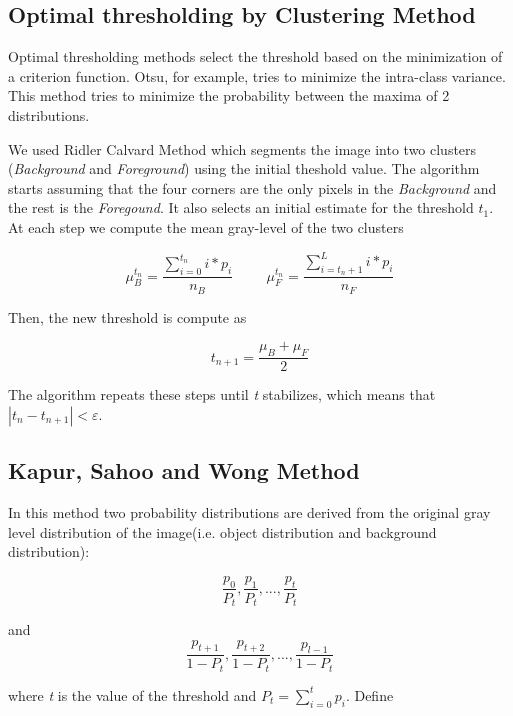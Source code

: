 \documentclass[12]{article}
\begin{document}
\subsection{Optimal thresholding by Clustering Method}
Optimal thresholding methods select the threshold based on the minimization of a criterion function. Otsu, for example, tries to minimize the intra-class variance. This method tries to minimize the probability between the maxima of 2 distributions.

We used Ridler Calvard Method which segments the image into two clusters (\textit{Background} and \textit{Foreground}) using the initial theshold value. The algorithm starts assuming that the four corners are the only pixels in the \textit{Background} and the rest is the \textit{Foregound}. It also selects an initial estimate for the threshold \textit{$t_1$}. At each step we compute the mean gray-level of the two clusters
\vspace{-0.5cm}
\begin{center}
$$ \mu_{B}^{t_n} = \frac{\sum_{i = 0}^{t_n} i * p_i}{n_B} \hspace{1cm} \mu_{F}^{t_n} = \frac{\sum_{i = t_n + 1}^{L} i * p_i}{n_F} $$
\end{center}
Then, the new threshold is compute as
\vspace{-0.5cm}
\begin{center}
$$ t_{n + 1} = \frac{\mu_{B} + \mu_{F}}{2} $$
\end{center}
The algorithm repeats these steps until \textit{t} stabilizes, which means that $|t_n - t_{n + 1}| < \varepsilon $.

\subsection{Kapur, Sahoo and Wong Method}
In this method two probability distributions are derived from the original gray level distribution of the image(i.e. object distribution and background distribution): 
\vspace{-0.5cm}
\begin{center}
$$\frac{p_0}{P_t},\frac{p_1}{P_t},...,\frac{p_t}{P_t}$$
\end{center} \begin{center}
and
$$\frac{p_{t+1}}{1-P_t},\frac{p_{t+2}}{1-P_t},...,\frac{p_{l-1}}{1-P_t}$$
\end{center}
\vspace{0.4cm}

where \textit{t} is the value of the threshold and $P_t = \sum_{i=0}^{t}{p_i}$. Define
\end{document}
